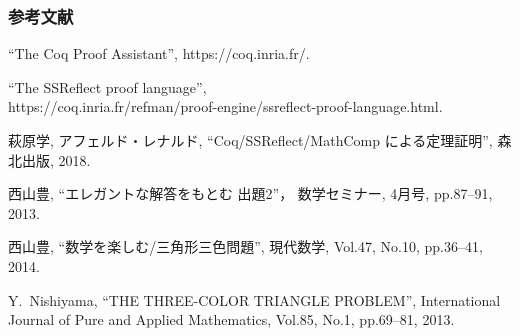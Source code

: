 \documentclass[dvipdfmx,cjk]{beamer}
\begin{document}
\begin{frame}
  \frametitle{参考文献}
  \begin{thebibliography}{99}
    ``The Coq Proof Assistant'',
    https://coq.inria.fr/. 

    ``The SSReflect proof language'',
    \\
    https://coq.inria.fr/refman/proof-engine/ssreflect-proof-language.html. 
    
    萩原学, アフェルド・レナルド, 
    ``Coq/SSReflect/MathComp による定理証明'',
    森北出版,
    2018. 
    
    西山豊,
    ``エレガントな解答をもとむ 出題2''，
    数学セミナー,
    4月号, pp.87--91, 2013.
    
    西山豊,
    ``数学を楽しむ/三角形三色問題'',
    現代数学,
    Vol.47, No.10, pp.36--41, 2014.
    
    Y.~Nishiyama,
    ``THE THREE-COLOR TRIANGLE PROBLEM'', 
    International Journal of Pure and Applied Mathematics,
    Vol.85, No.1, pp.69--81, 2013.
  \end{thebibliography}
\end{frame}
\end{document}
